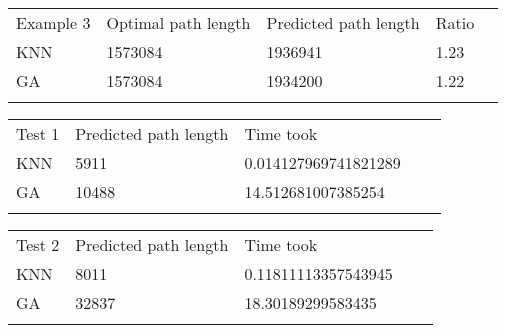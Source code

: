 \documentclass[onecolumn, draftclsnofoot,10pt, compsoc]{IEEEtran}
\begin{document}
\begin{table}[]
\begin{tabular}{lllll}
\cline{1-4}
\multicolumn{1}{|l|}{Example 3}    & \multicolumn{1}{l|}{Optimal path length} & \multicolumn{1}{l|}{Predicted path length} & \multicolumn{1}{l|}{Ratio} &  \\ \cline{1-4}
\multicolumn{1}{|l|}{KNN} & \multicolumn{1}{l|}{1573084}                    & \multicolumn{1}{l|}{1936941}                      & \multicolumn{1}{l|}{1.23}      &  \\ \cline{1-4}
\multicolumn{1}{|l|}{GA}  & \multicolumn{1}{l|}{1573084}                    & \multicolumn{1}{l|}{1934200}                      & \multicolumn{1}{l|}{1.22}      &  \\ \cline{1-4}
                          &                                          &                                            &                            & 
\end{tabular}
\end{table}
\begin{table}[]
\begin{tabular}{lllll}
\cline{1-3}
\multicolumn{1}{|l|}{Test 1}    & \multicolumn{1}{l|}{Predicted path length} & \multicolumn{1}{l|}{Time took} &  &  \\ \cline{1-3}
\multicolumn{1}{|l|}{KNN} & \multicolumn{1}{l|}{5911}                      & \multicolumn{1}{l|}{0.014127969741821289}          &  &  \\ \cline{1-3}
\multicolumn{1}{|l|}{GA}  & \multicolumn{1}{l|}{10488}                      & \multicolumn{1}{l|}{14.512681007385254}          &  &  \\ \cline{1-3}
                          &                                            &                                &  & 
\end{tabular}
\end{table}
\begin{table}[]
\begin{tabular}{lllll}
\cline{1-3}
\multicolumn{1}{|l|}{Test 2}    & \multicolumn{1}{l|}{Predicted path length} & \multicolumn{1}{l|}{Time took} &  &  \\ \cline{1-3}
\multicolumn{1}{|l|}{KNN} & \multicolumn{1}{l|}{8011}                      & \multicolumn{1}{l|}{0.11811113357543945}          &  &  \\ \cline{1-3}
\multicolumn{1}{|l|}{GA}  & \multicolumn{1}{l|}{32837}                      & \multicolumn{1}{l|}{18.30189299583435}          &  &  \\ \cline{1-3}
                          &                                            &                                &  & 
\end{tabular}
\end{table}
\end{document}
